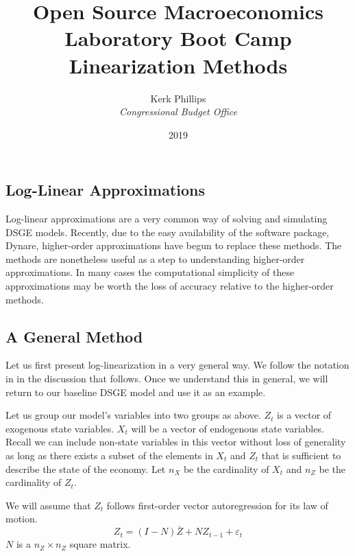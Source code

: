 \documentclass[letterpaper,12pt]{article}
\newcommand{\ve}{\varepsilon}
\theoremstyle{definition}
\begin{document}
\begin{titlepage}
	\title{Open Source Macroeconomics Laboratory Boot Camp \\ Linearization Methods}
	\author{Kerk Phillips\\ \emph{Congressional Budget Office}}
	\date{\LARGE{2019}}
	\maketitle
\end{titlepage}

\begin{spacing}{1.5}

\section{Log-Linear Approximations}\label{Linear_LogLinApprox}
	Log-linear approximations are a very common way of solving and simulating DSGE models. Recently, due to the easy availability of the software package, Dynare, higher-order approximations have begun to replace these methods. The methods are nonetheless useful as a step to understanding higher-order approximations. In many cases the computational simplicity of these approximations may be worth the loss of accuracy relative to the higher-order methods.

	\subsection{A General Method}\label{Linear_GenLogLin}
		Let us first present log-linearization in a very general way. We follow the notation in \cite{Uhlig1999} in the discussion that follows. Once we understand this in general, we will return to our baseline DSGE model and use it as an example.

		Let us group our model's variables into two groups as above. $Z_t$ is a vector of exogenous state variables. $X_t$ will be a vector of endogenous state variables. Recall we can include non-state variables in this vector without loss of generality as long as there exists a subset of the elements in $X_t$ and $Z_t$ that is sufficient to describe the state of the economy. Let $n_X$ be the cardinality of $X_t$ and $n_Z$ be the cardinality of $Z_t$.

		We will assume that $Z_t$ follows first-order vector autoregression for its law of motion.
		\begin{equation}\label{Linear_ZVARLogLin}
		Z_t = (I-N)\bar Z + N Z_{t-1} + \ve_t
		\end{equation}
		$N$ is a $n_Z\times n_Z$ square matrix.


\end{spacing}
\end{document}
